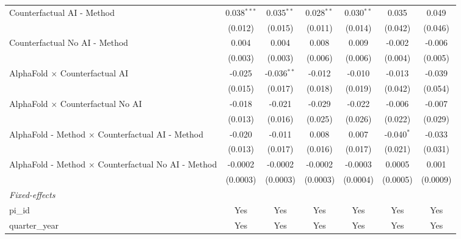 \begin{tabular}{lcccccc}
   Counterfactual AI - Method                                 & 0.038$^{***}$ & 0.035$^{**}$  & 0.028$^{**}$ & 0.030$^{**}$ & 0.035        & 0.049\\   
                                                              & (0.012)       & (0.015)       & (0.011)      & (0.014)      & (0.042)      & (0.046)\\   
   Counterfactual No AI - Method                              & 0.004         & 0.004         & 0.008        & 0.009        & -0.002       & -0.006\\   
                                                              & (0.003)       & (0.003)       & (0.006)      & (0.006)      & (0.004)      & (0.005)\\   
   AlphaFold $\times$ Counterfactual AI                       & -0.025        & -0.036$^{**}$ & -0.012       & -0.010       & -0.013       & -0.039\\   
                                                              & (0.015)       & (0.017)       & (0.018)      & (0.019)      & (0.042)      & (0.054)\\   
   AlphaFold $\times$ Counterfactual No AI                    & -0.018        & -0.021        & -0.029       & -0.022       & -0.006       & -0.007\\   
                                                              & (0.013)       & (0.016)       & (0.025)      & (0.026)      & (0.022)      & (0.029)\\   
   AlphaFold - Method $\times$ Counterfactual AI - Method     & -0.020        & -0.011        & 0.008        & 0.007        & -0.040$^{*}$ & -0.033\\   
                                                              & (0.013)       & (0.017)       & (0.016)      & (0.017)      & (0.021)      & (0.031)\\   
   AlphaFold - Method $\times$ Counterfactual No AI - Method  & -0.0002       & -0.0002       & -0.0002      & -0.0003      & 0.0005       & 0.001\\   
                                                              & (0.0003)      & (0.0003)      & (0.0003)     & (0.0004)     & (0.0005)     & (0.0009)\\   
   \midrule
   \emph{Fixed-effects}\\
   pi\_id                                                     & Yes           & Yes           & Yes          & Yes          & Yes          & Yes\\  
   quarter\_year                                              & Yes           & Yes           & Yes          & Yes          & Yes          & Yes\\  

\end{tabular}
